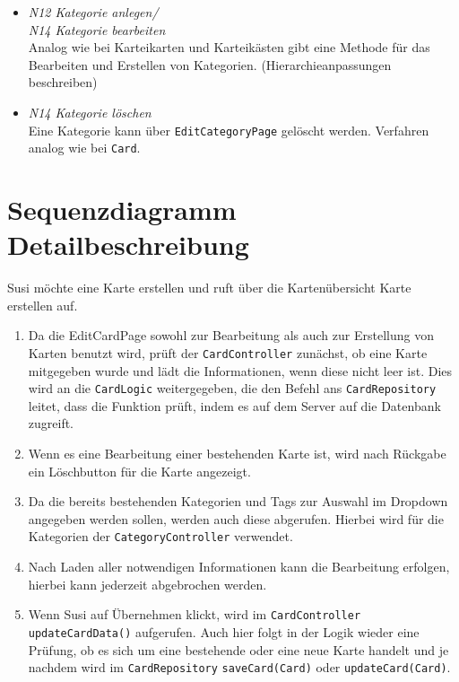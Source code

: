 \documentclass[fontsize=12pt,paper=A4,twoside]{scrartcl}
\begin{document}
    \begin{itemize}
        \item \textit{N12 Kategorie anlegen/ \\
         N14 Kategorie bearbeiten}\\
    Analog wie bei Karteikarten und Karteikästen gibt eine Methode für das Bearbeiten und Erstellen von Kategorien. (Hierarchieanpassungen beschreiben)
        \item \textit{N14 Kategorie löschen}\\
    Eine Kategorie kann über \texttt{EditCategoryPage} gelöscht werden. Verfahren analog wie bei \texttt{Card}.
    \end{itemize}
    \section{Sequenzdiagramm Detailbeschreibung}
    Susi möchte eine Karte erstellen und ruft über die Kartenübersicht Karte erstellen auf.\\
    \begin{enumerate}
    \item Da die EditCardPage sowohl zur Bearbeitung als auch zur Erstellung von Karten benutzt wird, prüft der \texttt{CardController}
    zunächst, ob eine Karte mitgegeben wurde und lädt die Informationen, wenn diese nicht leer ist. Dies wird an die \texttt{CardLogic} weitergegeben, die 
    den Befehl ans \texttt{CardRepository} leitet, dass die Funktion prüft, indem es auf dem Server auf die Datenbank zugreift.
    \item Wenn es eine Bearbeitung einer bestehenden Karte ist, wird nach Rückgabe ein Löschbutton für die Karte angezeigt.
    \item Da die bereits bestehenden Kategorien und Tags zur Auswahl im Dropdown angegeben werden sollen, werden auch diese abgerufen.
    Hierbei wird für die Kategorien der \texttt{CategoryController} verwendet.
    \item Nach Laden aller notwendigen Informationen kann die Bearbeitung erfolgen, hierbei kann jederzeit abgebrochen werden.
    \item Wenn Susi auf Übernehmen klickt, wird im \texttt{CardController} \texttt{updateCardData()} aufgerufen. Auch hier folgt
    in der Logik wieder eine Prüfung, ob es sich um eine bestehende oder eine neue Karte handelt und je nachdem wird im \texttt{CardRepository}
    \texttt{saveCard(Card)} oder \texttt{updateCard(Card)}.
    \end{enumerate}
\end{document}
